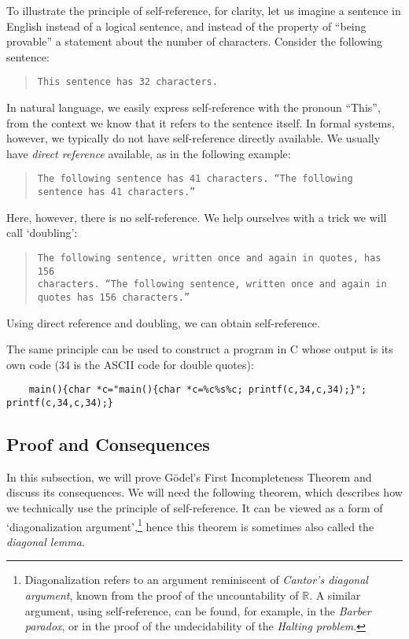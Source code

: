     To illustrate the principle of self-reference, for clarity, let us imagine a sentence in English instead of a logical sentence, and instead of the property of ``being provable'' a statement about the number of characters. Consider the following sentence:
    \begin{quote}
        \texttt{This sentence has 32 characters.}
    \end{quote}
    In natural language, we easily express self-reference with the pronoun ``This'', from the context we know that it refers to the sentence itself. In formal systems, however, we typically do not have self-reference directly available. We usually have \emph{direct reference} available, as in the following example:
    \begin{quote}
        \texttt{The following sentence has 41 characters. ``The following sentence has 41 characters.''}
    \end{quote}
    Here, however, there is no self-reference. We help ourselves with a trick we will call `doubling':
    \begin{quote}
        \texttt{The following sentence, written once and again in quotes, has 156\\ characters. ``The following sentence, written once and again in quotes\\ has 156 characters.''}
    \end{quote}
    Using direct reference and doubling, we can obtain self-reference.
    \begin{remark}
        The same principle can be used to construct a program in C whose output is its own code (34 is the ASCII code for double quotes):    
    {\small
    \begin{verbatim}
    main(){char *c="main(){char *c=%c%s%c; printf(c,34,c,34);}"; printf(c,34,c,34);}    
    \end{verbatim}
    }
    \end{remark}
    
    \subsection{Proof and Consequences}
    
    In this subsection, we will prove Gödel's First Incompleteness Theorem and discuss its consequences. We will need the following theorem, which describes how we technically use the principle of self-reference. It can be viewed as a form of `diagonalization argument',\footnote{Diagonalization refers to an argument reminiscent of \emph{Cantor's diagonal argument}, known from the proof of the uncountability of $\mathbb R$. A similar argument, using self-reference, can be found, for example, in the \emph{Barber paradox}, or in the proof of the undecidability of the \emph{Halting problem}.} hence this theorem is sometimes also called the \emph{diagonal lemma}.
    
